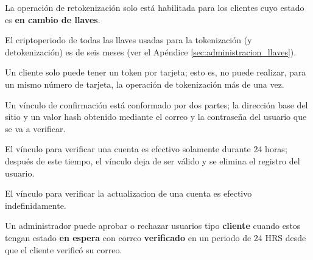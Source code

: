 {
  La operación de retokenización solo está habilitada para los clientes cuyo
  estado es \textbf{en cambio de llaves}.

}

{
  El criptoperiodo de todas las llaves usadas para la tokenización (y
  detokenización) es de seis meses (ver el Apéndice
  \ref{sec:administracion_llaves}).
}

{
  Un cliente solo puede tener un token por tarjeta; esto es, no puede realizar,
  para un mismo número de tarjeta, la operación de tokenización más de una vez.
}

{
  Un vínculo de confirmación está conformado por dos partes; la dirección base
  del sitio y un valor hash obtenido mediante el correo y la contraseña del
  usuario que se va a verificar.
}

{
  El vínculo para verificar una cuenta es efectivo solamente durante
  24 horas; después de este tiempo, el vínculo deja de ser válido y se elimina
  el registro del usuario.
}

{
  El vínculo para verificar la actualizacion de una cuenta es efectivo
  indefinidamente.
}

{
  Un administrador puede aprobar o rechazar usuarios tipo \textbf{cliente}
  cuando estos tengan estado \textbf{en espera} con correo \textbf{verificado}
  en un periodo de 24 HRS desde que el cliente verificó su correo.
}

